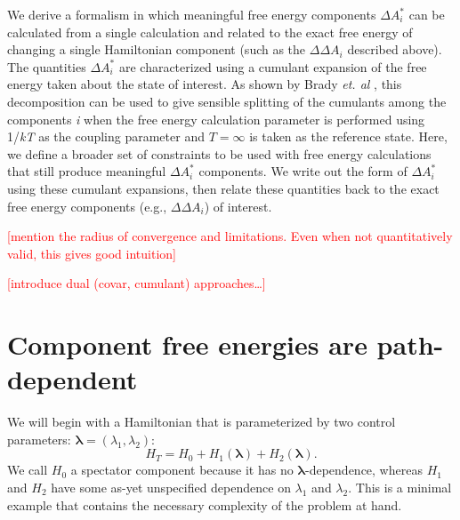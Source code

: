 \documentclass[%
 preprint,
 amsmath,amssymb,
 aps,
]{revtex4-1}
\newcommand{\warning}[1]{{\textsf{{\textcolor{red}{{[#1]}{}}}}}}
\renewcommand{\vec}[1]{{\bm{#1}}}
\begin{document}
We derive a formalism in which meaningful free energy components $\Delta A^*_i$ can be calculated from a single calculation and related to the exact free energy of changing a single Hamiltonian component (such as the $\Delta \Delta A_i$ described above).  The quantities $\Delta A^*_i$ are characterized using a cumulant expansion of the free energy taken about the state of interest.  As shown by Brady \emph{et. al} \cite{Brady:1996gm}, this decomposition can be used to give sensible splitting of the cumulants among the components \textit{i} when the free energy calculation parameter is performed using 1/\emph{kT} as the coupling parameter and $T=\infty$ is taken as the reference state.  Here, we define a broader set of constraints to be used with free energy calculations that still produce meaningful $\Delta A^*_i$ components.  We write out the form of $\Delta A^*_i$ using these cumulant expansions, then relate these quantities back to the exact free energy components (e.g., $\Delta \Delta A_i$) of interest.  

\warning{mention the radius of convergence and limitations.  Even when not quantitatively valid, this gives good intuition}

\warning{introduce dual (covar, cumulant) approaches\dots}

\section{Component free energies are path-dependent}

We will begin with a Hamiltonian that is parameterized by two control parameters: $\vec\lambda = (\lambda_1, \lambda_2)$:
\begin{equation}
H_T = H_0 + H_1(\vec\lambda) + H_2(\vec\lambda).
\end{equation}
We call $H_0$ a spectator component because it has no $\vec\lambda$-dependence, whereas $H_1$ and $H_2$ have some as-yet unspecified dependence on $\lambda_1$ and $\lambda_2$. This is a minimal example that contains the necessary complexity of the problem at hand.
\end{document}
